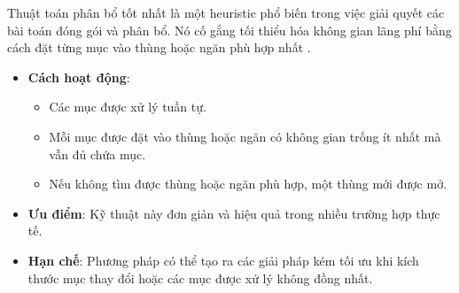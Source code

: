 \hspace{0.5cm}Thuật toán phân bổ tốt nhất là một heuristic phổ biến trong việc giải quyết các bài toán đóng gói và phân bổ. Nó cố gắng tối thiểu hóa không gian lãng phí bằng cách đặt từng mục vào thùng hoặc ngăn phù hợp nhất \cite{cao2011bestfit}.

\begin{itemize}
    \item \textbf{Cách hoạt động}:
        \begin{itemize}
            \item Các mục được xử lý tuần tự.
            \item Mỗi mục được đặt vào thùng hoặc ngăn có không gian trống ít nhất mà vẫn đủ chứa mục.
            \item Nếu không tìm được thùng hoặc ngăn phù hợp, một thùng mới được mở.
        \end{itemize}
    \item \textbf{Ưu điểm}: Kỹ thuật này đơn giản và hiệu quả trong nhiều trường hợp thực tế.
    \item \textbf{Hạn chế}: Phương pháp có thể tạo ra các giải pháp kém tối ưu khi kích thước mục thay đổi hoặc các mục được xử lý không đồng nhất.
\end{itemize}




